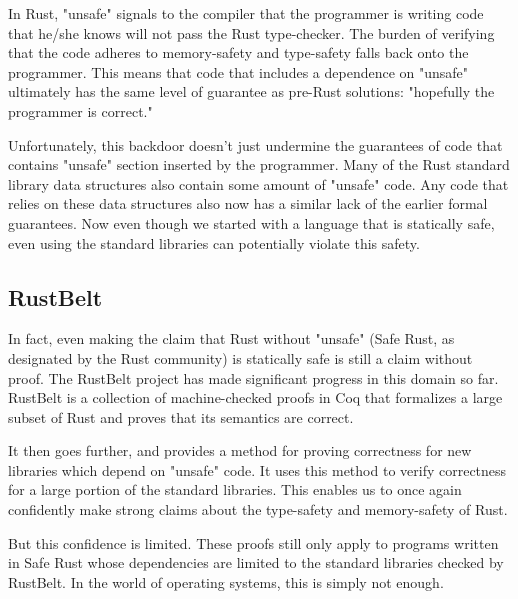 \documentclass[12pt]{article}
\begin{document}
In Rust, "unsafe" signals to the compiler that the programmer is writing code that he/she knows will not pass the Rust type-checker. The burden of verifying that the code adheres to memory-safety and type-safety falls back onto the programmer. This means that code that includes a dependence on "unsafe" ultimately has the same level of guarantee as pre-Rust solutions: "hopefully the programmer is correct."

Unfortunately, this backdoor doesn't just undermine the guarantees of code that contains "unsafe" section inserted by the programmer. Many of the Rust standard library data structures also contain some amount of "unsafe" code. Any code that relies on these data structures also now has a similar lack of the earlier formal guarantees. Now even though we started with a language that is statically safe, even using the standard libraries can potentially violate this safety.

\subsection{RustBelt}
In fact, even making the claim that Rust without "unsafe" (Safe Rust, as designated by the Rust community) is statically safe is still a claim without proof. The RustBelt project has made significant progress in this domain so far. RustBelt is a collection of machine-checked proofs in Coq that formalizes a large subset of Rust and proves that its semantics are correct.

It then goes further, and provides a method for proving correctness for new libraries which depend on "unsafe" code. It uses this method to verify correctness for a large portion of the standard libraries. This enables us to once again confidently make strong claims about the type-safety and memory-safety of Rust.

But this confidence is limited. These proofs still only apply to programs written in Safe Rust whose dependencies are limited to the standard libraries checked by RustBelt. In the world of operating systems, this is simply not enough.
\end{document}
